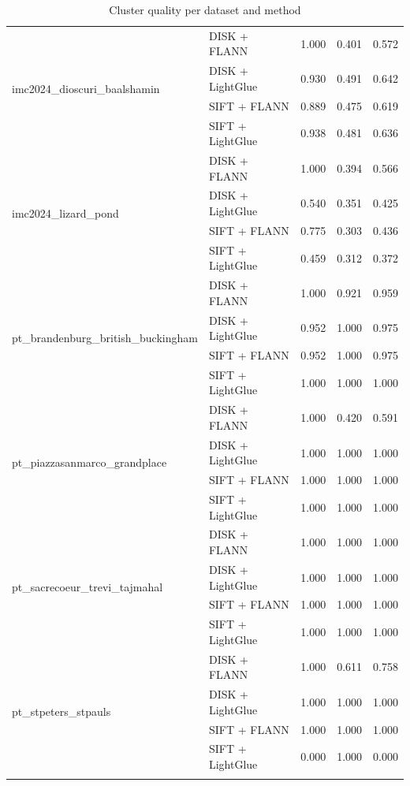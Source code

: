 \documentclass[report.tex]{subfiles}
\begin{document}
\begin{longtable}{llrrr}
\cline{1-5}
\multirow[t]{4}{*}{imc2024\_dioscuri\_baalshamin} & DISK + FLANN & 1.000 & 0.401 & 0.572 \\
 & DISK + LightGlue & 0.930 & 0.491 & 0.642 \\
 & SIFT + FLANN & 0.889 & 0.475 & 0.619 \\
 & SIFT + LightGlue & 0.938 & 0.481 & 0.636 \\
\cline{1-5}
\multirow[t]{4}{*}{imc2024\_lizard\_pond} & DISK + FLANN & 1.000 & 0.394 & 0.566 \\
 & DISK + LightGlue & 0.540 & 0.351 & 0.425 \\
 & SIFT + FLANN & 0.775 & 0.303 & 0.436 \\
 & SIFT + LightGlue & 0.459 & 0.312 & 0.372 \\
\cline{1-5}
\multirow[t]{4}{*}{pt\_brandenburg\_british\_buckingham} & DISK + FLANN & 1.000 & 0.921 & 0.959 \\
 & DISK + LightGlue & 0.952 & 1.000 & 0.975 \\
 & SIFT + FLANN & 0.952 & 1.000 & 0.975 \\
 & SIFT + LightGlue & 1.000 & 1.000 & 1.000 \\
\cline{1-5}
\multirow[t]{4}{*}{pt\_piazzasanmarco\_grandplace} & DISK + FLANN & 1.000 & 0.420 & 0.591 \\
 & DISK + LightGlue & 1.000 & 1.000 & 1.000 \\
 & SIFT + FLANN & 1.000 & 1.000 & 1.000 \\
 & SIFT + LightGlue & 1.000 & 1.000 & 1.000 \\
\cline{1-5}
\multirow[t]{4}{*}{pt\_sacrecoeur\_trevi\_tajmahal} & DISK + FLANN & 1.000 & 1.000 & 1.000 \\
 & DISK + LightGlue & 1.000 & 1.000 & 1.000 \\
 & SIFT + FLANN & 1.000 & 1.000 & 1.000 \\
 & SIFT + LightGlue & 1.000 & 1.000 & 1.000 \\
\cline{1-5}
\multirow[t]{4}{*}{pt\_stpeters\_stpauls} & DISK + FLANN & 1.000 & 0.611 & 0.758 \\
 & DISK + LightGlue & 1.000 & 1.000 & 1.000 \\
 & SIFT + FLANN & 1.000 & 1.000 & 1.000 \\
 & SIFT + LightGlue & 0.000 & 1.000 & 0.000 \\
\caption{Cluster quality per dataset and method}
\label{tab:quality-per-dataset}
\end{longtable}

\end{document}
